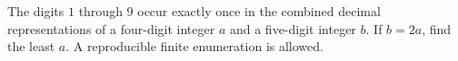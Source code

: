 The digits $1$ through $9$ occur exactly once in the combined decimal representations of a four-digit integer $a$ and a five-digit integer $b$. If $b=2a$, find the least $a$. A reproducible finite enumeration is allowed.
